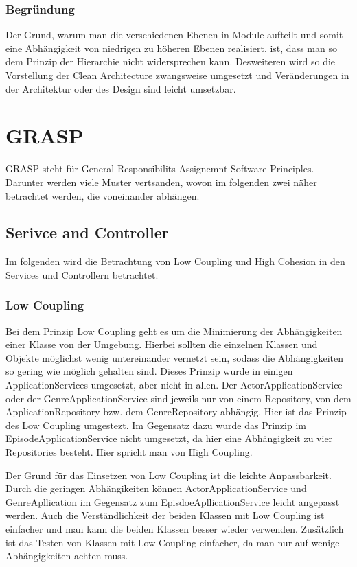         \subsubsection{Begründung}
        Der Grund, warum man die verschiedenen Ebenen in Module aufteilt und somit eine Abhängigkeit von niedrigen zu höheren Ebenen realisiert, ist, dass man so dem Prinzip der Hierarchie nicht widersprechen kann. Desweiteren wird so die Vorstellung der Clean Architecture zwangsweise umgesetzt und Veränderungen in der Architektur oder des Design sind leicht umsetzbar. 

\section{GRASP}
GRASP steht für General Responsibilits Assignemnt Software Principles. Darunter werden viele Muster vertsanden, wovon im folgenden zwei näher betrachtet werden, die voneinander abhängen.

    \subsection{Serivce and Controller}
    Im folgenden wird die Betrachtung von Low Coupling und High Cohesion in den Services und Controllern betrachtet.

        \subsubsection{Low Coupling}
        
            Bei dem Prinzip Low Coupling geht es um die Minimierung der Abhängigkeiten einer Klasse von der Umgebung. Hierbei sollten die einzelnen Klassen und Objekte möglichst wenig untereinander vernetzt sein, sodass die Abhängigkeiten so gering wie möglich gehalten sind. Dieses Prinzip wurde in einigen ApplicationServices umgesetzt, aber nicht in allen. Der ActorApplicationService oder der GenreApplicationService sind jeweils nur von einem Repository, von dem ApplicationRepository bzw. dem GenreRepository abhängig. Hier ist das Prinzip des Low Coupling umgestezt. Im Gegensatz dazu wurde das Prinzip im EpisodeApplicationService nicht umgesetzt, da hier eine Abhängigkeit zu vier Repositories besteht. Hier spricht man von High Coupling.
            
            Der Grund für das Einsetzen von Low Coupling ist die leichte Anpassbarkeit. Durch die geringen Abhängikeiten können ActorApplicationService und GenreApllication im Gegensatz zum EpisdoeApllicationService leicht angepasst werden. Auch die Verständlichkeit der beiden Klassen mit Low Coupling ist einfacher und man kann die beiden Klassen besser wieder verwenden. Zusätzlich ist das Testen von Klassen mit Low Coupling einfacher, da man nur auf wenige Abhängigkeiten achten muss.
    
